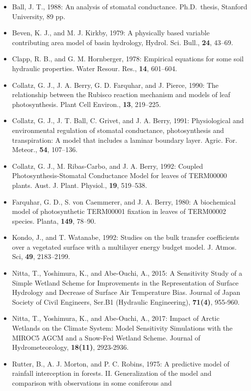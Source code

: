 \begin{itemize}
\item
  Ball, J. T., 1988: An analysis of stomatal conductance. Ph.D.~thesis, Stanford University, 89 pp.
\item
  Beven, K. J., and M. J. Kirkby, 1979: A physically based variable contributing area model of basin hydrology, {Hydrol. Sci. Bull.}, {\textbf{24}}, 43--69.
\item
  Clapp, R. B., and G. M. Hornberger, 1978: Empirical equations for some soil hydraulic properties. {Water Resour. Res.}, {\textbf{14}}, 601--604.
\item
  Collatz, G. J., J. A. Berry, G. D. Farquhar, and J. Pierce, 1990: The relationship between the Rubisco reaction mechanism and models of leaf photosynthesis. {Plant Cell Environ.}, {\textbf{13}},
  219--225.
\item
  Collatz, G. J., J. T. Ball, C. Grivet, and J. A. Berry, 1991: Physiological and environmental regulation of stomatal conductance, photosynthesis and transpiration: A model that includes a laminar
  boundary layer. {Agric. For. Meteor.}, {\textbf{54}}, 107--136.
\item
  Collatz, G. J., M. Ribas-Carbo, and J. A. Berry, 1992: Coupled Photosynthesis-Stomatal Conductance Model for leaves of TERM00000 plants. {Aust. J. Plant. Physiol.}, {\textbf{19}}, 519--538.
\item
  Farquhar, G. D., S. von Caemmerer, and J. A. Berry, 1980: A biochemical model of photosynthetic TERM00001 fixation in leaves of TERM00002 species. {Planta}, {\textbf{149}}, 78--90.
\item
  Kondo, J., and T. Watanabe, 1992: Studies on the bulk transfer coefficients over a vegetated surface with a multilayer energy budget model. {J. Atmos. Sci}, {\textbf{49}}, 2183--2199.
\item
  Nitta, T., Yoshimura, K., and Abe-Ouchi, A., 2015: A Sensitivity Study of a Simple Wetland Scheme for Improvements in the Representation of Surface Hydrology and Decrease of Surface Air Temperature
  Bias. {Journal of Japan Society of Civil Engineers, Ser.B1 (Hydraulic Engineering)}, {\textbf{71(4)}}, 955-960.
\item
  Nitta, T., Yoshimura, K., and Abe-Ouchi, A., 2017: Impact of Arctic Wetlands on the Climate System: Model Sensitivity Simulations with the MIROC5 AGCM and a Snow-Fed Wetland Scheme. { Journal of
  Hydrometeorology}, {\textbf{18(11)}}, 2923-2936.
\item
  Rutter, B., A. J. Morton, and P. C. Robins, 1975: A predictive model of rainfall interception in forests. II. Generalization of the model and comparison with observations in some coniferous and

\end{itemize}
